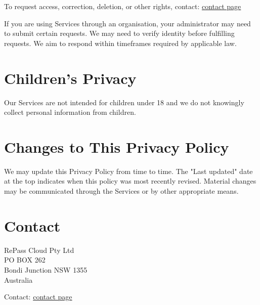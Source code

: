 \documentclass[11pt]{article}
\begin{document}
To request access, correction, deletion, or other rights, contact: \href{/contact}{contact page}

If you are using Services through an organisation, your administrator may need to submit certain requests. We may need to verify identity before fulfilling requests. We aim to respond within timeframes required by applicable law.

\section{Children's Privacy}

Our Services are not intended for children under 18 and we do not knowingly collect personal information from children.

\section{Changes to This Privacy Policy}

We may update this Privacy Policy from time to time. The "Last updated" date at the top indicates when this policy was most recently revised. Material changes may be communicated through the Services or by other appropriate means.

\section{Contact}

RePass Cloud Pty Ltd \\
PO BOX 262 \\
Bondi Junction NSW 1355 \\
Australia

Contact: \href{/contact}{contact page}
\end{document}
